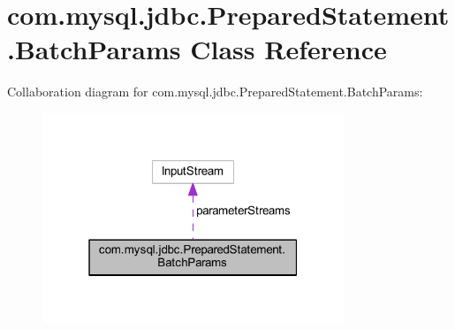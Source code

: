 \hypertarget{classcom_1_1mysql_1_1jdbc_1_1_prepared_statement_1_1_batch_params}{}\section{com.\+mysql.\+jdbc.\+Prepared\+Statement.\+Batch\+Params Class Reference}
\label{classcom_1_1mysql_1_1jdbc_1_1_prepared_statement_1_1_batch_params}


Collaboration diagram for com.\+mysql.\+jdbc.\+Prepared\+Statement.\+Batch\+Params\+:
\nopagebreak
\begin{figure}[H]
\begin{center}
\leavevmode
\includegraphics[width=256pt]{classcom_1_1mysql_1_1jdbc_1_1_prepared_statement_1_1_batch_params__coll__graph}
\end{center}
\end{figure}
